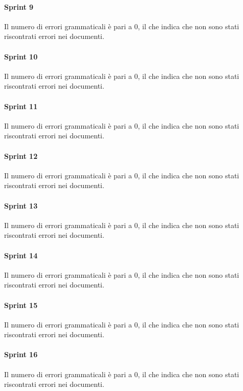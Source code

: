 \paragraph{Sprint 9}
Il numero di errori grammaticali è pari a 0, il che indica che non sono stati riscontrati errori nei documenti.

\paragraph{Sprint 10}
Il numero di errori grammaticali è pari a 0, il che indica che non sono stati riscontrati errori nei documenti.

\paragraph{Sprint 11}
Il numero di errori grammaticali è pari a 0, il che indica che non sono stati riscontrati errori nei documenti.

\paragraph{Sprint 12}
Il numero di errori grammaticali è pari a 0, il che indica che non sono stati riscontrati errori nei documenti.

\paragraph{Sprint 13}
Il numero di errori grammaticali è pari a 0, il che indica che non sono stati riscontrati errori nei documenti.

\paragraph{Sprint 14}
Il numero di errori grammaticali è pari a 0, il che indica che non sono stati riscontrati errori nei documenti.

\paragraph{Sprint 15}
Il numero di errori grammaticali è pari a 0, il che indica che non sono stati riscontrati errori nei documenti.

\paragraph{Sprint 16}
Il numero di errori grammaticali è pari a 0, il che indica che non sono stati riscontrati errori nei documenti.